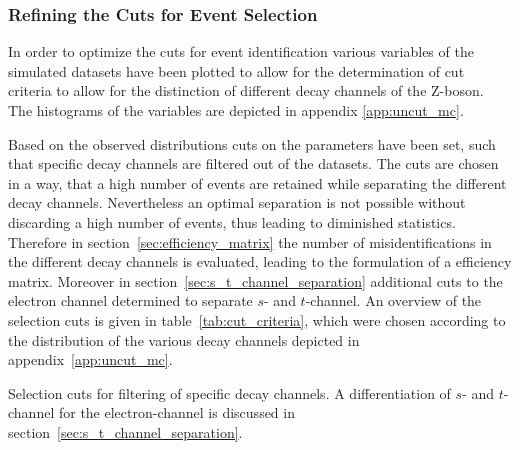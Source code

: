 \documentclass[11pt, a4paper]{article}
\numberwithin{equation}{section}
\begin{document}
\subsubsection{Refining the Cuts for Event Selection}
In order to optimize the cuts for event identification various variables of the simulated datasets have been plotted to allow for the determination of cut criteria to allow for the distinction of different decay channels of the Z-boson.
The histograms of the variables are depicted in appendix \ref{app:uncut_mc}.

Based on the observed distributions cuts on the parameters have been set, such that specific decay channels are filtered out of the datasets.
The cuts are chosen in a way, that a high number of events are retained while separating the different decay channels.
Nevertheless an optimal separation is not possible without discarding a high number of events, thus leading to diminished statistics.
Therefore in section~\ref{sec:efficiency_matrix} the number of misidentifications in the different decay channels is evaluated, leading to the formulation of a efficiency matrix.
Moreover in section~\ref{sec:s_t_channel_separation} additional cuts to the electron channel determined to separate $s$- and $t$-channel.
An overview of the selection cuts is given in table~\ref{tab:cut_criteria}, which were chosen according to the distribution of the various decay channels depicted in appendix~\ref{app:uncut_mc}.
\begin{table}[h]
	\centering
	
	\caption{Selection cuts for filtering of specific decay channels. A differentiation of $s$- and $t$-channel for the electron-channel is discussed in section~\ref{sec:s_t_channel_separation}.}
	\label{tab:cut_criteria}
\end{table}
\end{document}
